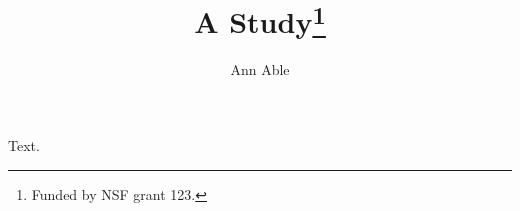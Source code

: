 \documentclass{article}
\begin{document}
\title{A Study\thanks{Funded by NSF grant 123.}}
\author{Ann Able}
\maketitle
Text.
\end{document}
